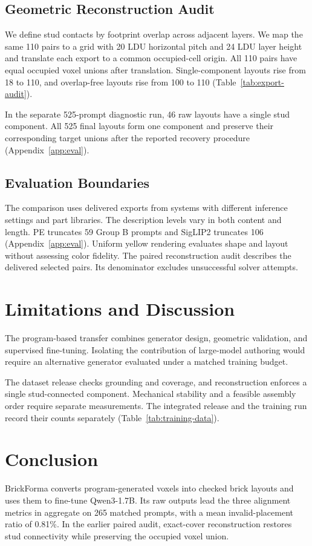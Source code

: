 \documentclass[letterpaper]{article} %
\begin{document}
\subsection{Geometric Reconstruction Audit}
\label{sec:diagnostics}
We define stud contacts by footprint overlap across adjacent layers. We map the same 110 pairs to a grid with 20 LDU horizontal pitch and 24 LDU layer height and translate each export to a common occupied-cell origin. All 110 pairs have equal occupied voxel unions after translation. Single-component layouts rise from 18 to 110, and overlap-free layouts rise from 100 to 110 (Table~\ref{tab:export-audit}).


In the separate 525-prompt diagnostic run, 46 raw layouts have a single stud component. All 525 final layouts form one component and preserve their corresponding target unions after the reported recovery procedure (Appendix~\ref{app:eval}).

\subsection{Evaluation Boundaries}
The comparison uses delivered exports from systems with different inference settings and part libraries. The description levels vary in both content and length. PE truncates 59 Group B prompts and SigLIP2 truncates 106 (Appendix~\ref{app:eval}). Uniform yellow rendering evaluates shape and layout without assessing color fidelity. The paired reconstruction audit describes the delivered selected pairs. Its denominator excludes unsuccessful solver attempts.

\section{Limitations and Discussion}
The program-based transfer combines generator design, geometric validation, and supervised fine-tuning. Isolating the contribution of large-model authoring would require an alternative generator evaluated under a matched training budget.

The dataset release checks grounding and coverage, and reconstruction enforces a single stud-connected component. Mechanical stability and a feasible assembly order require separate measurements. The integrated release and the training run record their counts separately (Table~\ref{tab:training-data}).

\section{Conclusion}
BrickForma converts program-generated voxels into checked brick layouts and uses them to fine-tune Qwen3-1.7B. Its raw outputs lead the three alignment metrics in aggregate on 265 matched prompts, with a mean invalid-placement ratio of 0.81\%. In the earlier paired audit, exact-cover reconstruction restores stud connectivity while preserving the occupied voxel union.

\FloatBarrier
\appendix
\end{document}
